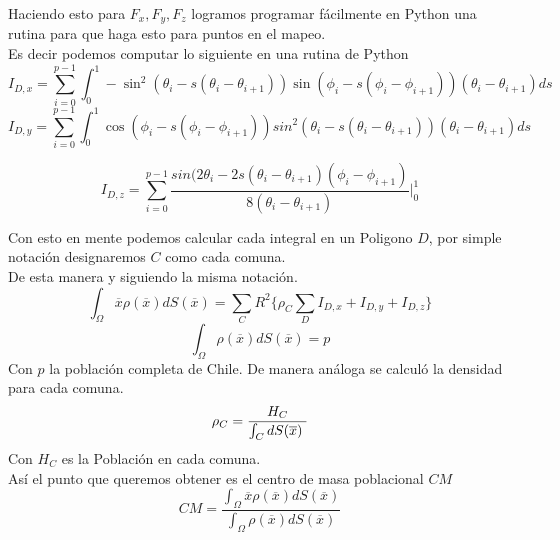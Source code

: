 \documentclass[20pt]{report}
\begin{document}
\begin{itemize}
Haciendo esto para $F_x,F_y,F_z$ logramos programar f\'acilmente en Python una rutina para que haga esto para puntos en el mapeo.
\\
Es decir podemos computar lo siguiente en una rutina de Python
\begin{equation}
I_{D,x}= \sum_{i=0}^{p-1}\int_{0}^1 -\sin^2(\theta_i - s(\theta_i - \theta_{i+1})) \sin(\phi_i - s(\phi_i - \phi_{i+1}))(\theta_i - \theta_{i+1}) ds
\end{equation}
\begin{equation}
I_{D,y}= \sum_{i=0}^{p-1}\int_{0}^1 \cos(\phi_i - s(\phi_i - \phi_{i+1}))sin^2(\theta_i - s(\theta_i - \theta_{i+1}))(\theta_i - \theta_{i+1}) ds
\end{equation}

\begin{equation}
I_{D,z}= \sum_{i=0}^{p-1} \dfrac{sin(2\theta_i - 2s(\theta_i - \theta_{i+1})(\phi_i - \phi_{i+1})}{8(\theta_i - \theta_{i+1})}|_{0}^1
\end{equation}


Con esto en mente podemos calcular cada integral en un Poligono $D$, por simple notaci\'on designaremos $C$ como cada comuna.
\\
De esta manera y siguiendo la misma notaci\'on.
\begin{equation}
\int_{\Omega} \overline{x}\rho(\overline{x}) dS(\overline{x})=\sum_{C} R^2  \lbrace \rho_{C} \sum_{D} I_{D,x} + I_{D,y}+ I_{D,z} \rbrace 
\end{equation}
\begin{equation}
\int_{\Omega} \rho(\overline{x}) dS(\overline{x})=p
\end{equation}
Con $p$ la poblaci\'on completa de Chile.
De manera an\'aloga se calcul\'o la densidad para cada  comuna. 
\begin{equation}
\rho_{C}= \dfrac{H_C}{ \int_{C} dS(\overline{x}) \hspace{0.1cm} }  
\end{equation}
Con $H_C$ es la Poblaci\'on en cada comuna.\\

As\'i el punto que queremos obtener es el centro de masa poblacional $CM$
$${CM}=\dfrac{\int_{\Omega} \overline{x}\rho(\overline{x}) dS(\overline{x})}{\int_{\Omega} \rho(\overline{x}) dS(\overline{x})}$$
\pagebreak


\end{itemize}
\end{document}
